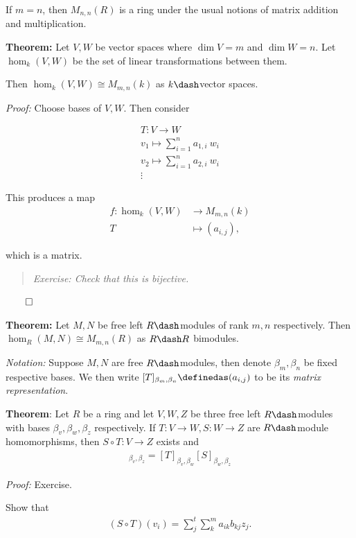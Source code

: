 If \(m=n\), then \(M_{n,n}(R)\) is a ring under the usual notions of
matrix addition and multiplication.

\textbf{Theorem:} Let \(V, W\) be vector spaces where \(\dim V = m\) and
\(\dim W = n\). Let \(\hom_k(V, W)\) be the set of linear
transformations between them.

Then \(\hom_k(V, W) \cong M_{m, n}(k)\) as \(k\dash\)vector spaces.

\emph{Proof:} Choose bases of \(V, W\). Then consider

\begin{align*}
T: V \to W \\
v_1 \mapsto \sum_{i=1}^n a_{1, i} ~w_i \\
v_2 \mapsto \sum_{i=1}^n a_{2, i} ~w_i \\
\vdots
\end{align*}

This produces a map \begin{align*}
f: \hom_k(V, W) &\to M_{m, n}(k) \\
T &\mapsto (a_{i, j})
,\end{align*}

which is a matrix.

\begin{quote}
\emph{Exercise: Check that this is bijective.}
\end{quote}

\(\qed\)

\textbf{Theorem:} Let \(M, N\) be free left \(R\dash\)modules of rank
\(m, n\) respectively. Then \(\hom_R(M, N) \cong M_{m, n}(R)\) as
\(R\dash R\) bimodules.

\emph{Notation:} Suppose \(M, N\) are free \(R\dash\)modules, then
denote \(\beta_m, \beta_n\) be fixed respective bases. We then write
\([T]_{\beta_m, \beta_n} \definedas (a_{i, j})\) to be its \emph{matrix
representation}.

\textbf{Theorem}: Let \(R\) be a ring and let \(V, W, Z\) be three free
left \(R\dash\)modules with bases \(\beta_v, \beta_w, \beta_z\)
respectively. If \(T: V \to W, S: W\to Z\) are \(R\dash\)module
homomorphisms, then \(S \circ T: V \to Z\) exists and
\begin{align*}
[S \circ T]_{\beta_v, \beta_z} = [T]_{\beta_v, \beta_w} [S]_{\beta_w, \beta_z}
\end{align*}

\emph{Proof:} Exercise.

Show that
\begin{align*}
(S \circ T)(v_i) = \sum_j^t \sum_k^m a_{ik} b_{kj} z_j
.\end{align*}

